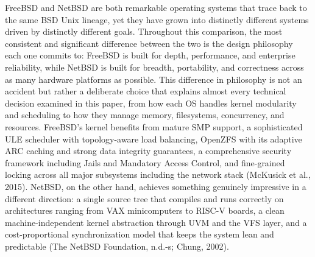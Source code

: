 FreeBSD and NetBSD are both remarkable operating systems that trace back to the same BSD Unix lineage, yet they have grown into distinctly different systems driven by distinctly different goals. Throughout this comparison, the most consistent and significant difference between the two is the design philosophy each one commits to: FreeBSD is built for depth, performance, and enterprise reliability, while NetBSD is built for breadth, portability, and correctness across as many hardware platforms as possible. This difference in philosophy is not an accident but rather a deliberate choice that explains almost every technical decision examined in this paper, from how each OS handles kernel modularity and scheduling to how they manage memory, filesystems, concurrency, and resources. FreeBSD's kernel benefits from mature SMP support, a sophisticated ULE scheduler with topology-aware load balancing, OpenZFS with its adaptive ARC caching and strong data integrity guarantees, a comprehensive security framework including Jails and Mandatory Access Control, and fine-grained locking across all major subsystems including the network stack (McKusick et al., 2015). NetBSD, on the other hand, achieves something genuinely impressive in a different direction: a single source tree that compiles and runs correctly on architectures ranging from VAX minicomputers to RISC-V boards, a clean machine-independent kernel abstraction through UVM and the VFS layer, and a cost-proportional synchronization model that keeps the system lean and predictable (The NetBSD Foundation, n.d.-s; Chung, 2002).


